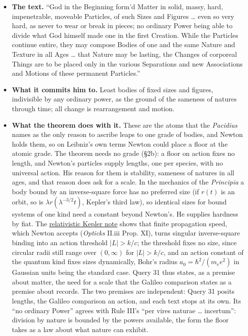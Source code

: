 \documentclass[11pt,a4paper]{article}
\newcommand{\tightlist}{\setlength{\itemsep}{0pt}\setlength{\parskip}{0pt}}
\begin{document}
\begin{itemize}
\tightlist
\item
  \textbf{The text.} ``God in the Beginning form'd Matter in solid,
  massy, hard, impenetrable, moveable Particles, of such Sizes and
  Figures \ldots{} even so very hard, as never to wear or break in
  pieces; no ordinary Power being able to divide what God himself made
  one in the first Creation. While the Particles continue entire, they
  may compose Bodies of one and the same Nature and Texture in all Ages
  \ldots{} that Nature may be lasting, the Changes of corporeal Things
  are to be placed only in the various Separations and new Associations
  and Motions of these permanent Particles.''
\item
  \textbf{What it commits him to.} Least bodies of fixed sizes and
  figures, indivisible by any ordinary power, as the ground of the
  sameness of natures through time; all change is rearrangement and
  motion.
\item
  \textbf{What the theorem does with it.} These are the atoms that the
  \emph{Pacidius} names as the only reason to ascribe leaps to one grade
  of bodies, and Newton holds them, so on Leibniz's own terms Newton
  could place a floor at the atomic grade. The theorem needs no grade
  (§2b): a floor on action fixes no length, and Newton's particles
  supply lengths, one per species, with no universal action. His reason
  for them is stability, sameness of natures in all ages, and that
  reason does ask for a scale. In the mechanics of the \emph{Principia}
  a body bound by an inverse-square force has no preferred size (if
  \(r(t)\) is an orbit, so is \(\lambda r(\lambda^{-3/2}t)\), Kepler's
  third law), so identical sizes for bound systems of one kind need a
  constant beyond Newton's. He supplies hardness by fiat. The
  \href{action-unit-dimensional-selection.md\#singular-and-softened-relativistic-coulomb-cores}{relativistic
  Kepler note} shows that finite propagation speed, which Newton accepts
  (\emph{Opticks} II.iii Prop. XI), turns singular inverse-square
  binding into an action threshold \(|L|>k/c\); the threshold fixes no
  size, since circular radii still range over \((0,\infty)\) for
  \(|L|>k/c\), and an action constant of the quantum kind fixes sizes
  dynamically, Bohr's radius \(a_0=\hbar^2/(m_ee^2)\) in Gaussian units
  being the standard case. Query 31 thus states, as a premise about
  matter, the need for a scale that the Galileo comparison states as a
  premise about records. The two premises are independent: Query 31
  posits lengths, the Galileo comparison an action, and each text stops
  at its own. Its ``no ordinary Power'' agrees with Rule III's ``per
  vires naturae \ldots{} incertum'': division by nature is bounded by
  the powers available, the form the floor takes as a law about what
  nature can exhibit.
\end{itemize}
\end{document}
